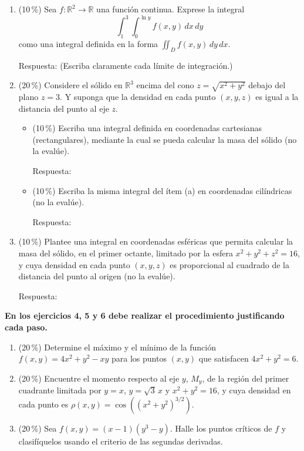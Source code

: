 \documentclass[11pt]{article}
\begin{document}
\begin{enumerate}
\item{} (10\,\%) Sea $f: \mathbb{R}^2 \to \mathbb{R}$ una función continua. Exprese la integral
\[
\int_1^3 \int_0^{\ln y} f(x,y)\,dx\,dy
\]
como una integral definida en la forma $\displaystyle\iint_D f(x,y)\,dy\,dx$.

\vspace{2pt}
\noindent Respuesta: \underline{\phantom{XXXXXXXXXXXXXXXX}}\quad (Escriba claramente cada límite de integración.)

\item{} (20\,\%) Considere el sólido en $\mathbb{R}^3$ encima del cono $z = \sqrt{x^2+y^2}$ debajo del plano $z = 3$. Y suponga que la densidad en cada punto $(x,y,z)$ es igual a la distancia del punto al eje $z$.
\begin{itemize}
\item[(a)] (10\,\%) Escriba una integral definida en coordenadas cartesianas (rectangulares), mediante la cual se pueda calcular la masa del sólido (no la evalúe).

\vspace{2pt}
\noindent Respuesta: \underline{\phantom{XXXXXXXXXXXXXXXX}}
\item[(b)] (10\,\%) Escriba la misma integral del ítem (a) en coordenadas cilíndricas (no la evalúe).

\vspace{2pt}
\noindent Respuesta: \underline{\phantom{XXXXXXXXXXXXXXXX}}
\end{itemize}

\item{} (10\,\%) Plantee una integral en coordenadas esféricas que permita calcular la masa del sólido, en el primer octante, limitado por la esfera $x^2 + y^2 + z^2 = 16$, y cuya densidad en cada punto $(x,y,z)$ es proporcional al cuadrado de la distancia del punto al origen (no la evalúe).

\vspace{2pt}
\noindent Respuesta: \underline{\phantom{XXXXXXXXXXXXXXXX}}
\end{enumerate}

\vspace{4pt}
\noindent\textbf{En los ejercicios 4, 5 y 6 debe realizar el procedimiento justificando cada paso.}

\begin{enumerate}[start=4]
\item{} (20\,\%) Determine el máximo y el mínimo de la función $f(x,y) = 4x^2 + y^2 - xy$ para los puntos $(x,y)$ que satisfacen $4x^2 + y^2 = 6$.

\item{} (20\,\%) Encuentre el momento respecto al eje $y$, $M_y$, de la región del primer cuadrante limitada por $y = x$, $y = \sqrt3\,x$ y $x^2 + y^2 = 16$, y cuya densidad en cada punto es $\rho(x,y) = \cos\!\left((x^2+y^2)^{3/2}\right)$.

\item{} (20\,\%) Sea $f(x,y) = (x - 1)(y^3 - y)$. Halle los puntos críticos de $f$ y clasifíquelos usando el criterio de las segundas derivadas.
\end{enumerate}

\examfooter
\end{document}
